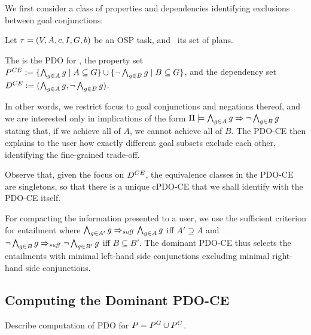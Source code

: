 We first consider a class of properties and dependencies identifying
exclusions between goal conjunctions:

\begin{definition}
Let $\tau =
(V,\allowbreak A,\allowbreak{\ensuremath{c}},\allowbreak I,\allowbreak G,\allowbreak{\ensuremath{b}})$
be an OSP task, and \plans\ its set of plans.  

The  is the PDO for
\plans, the property set $P^{CE} := \{\bigwedge_{g \in A}
g\allowbreak\mid\allowbreak A \subseteq G\} \cup \{\neg \bigwedge_{g
  \in B} g \allowbreak\mid\allowbreak B \subseteq G\}$, and the
dependency set $D^{CE} := (\bigwedge_{g \in A} g,\allowbreak\neg
\bigwedge_{g \in B} g)$.
\end{definition}

In other words, we restrict focus to goal conjunctions and negations
thereof, and we are interested only in implications of the form
$\Pi \models \bigwedge_{g \in A} g \Rightarrow \neg \bigwedge_{g \in B} g$
stating that, if we achieve all of $A$, we cannot achieve all of
$B$. The PDO-CE then explains to the user how exactly different goal
subsets exclude each other, identifying the fine-grained trade-off.

Observe that, given the focus on $D^{CE}$, the equivalence classes
in the PDO-CE are singletons, so that there is a unique cPDO-CE that
we shall identify with the PDO-CE itself.

For compacting the information presented to a user, we use the
sufficient criterion for entailment where $\bigwedge_{g \in A'} g
\Rightarrow_{\mathit{suff}} \bigwedge_{g \in A} g$ iff $A' \supseteq A$ and $\neg
\bigwedge_{g \in B} g \Rightarrow_{\mathit{suff}} \neg \bigwedge_{g \in B'} g$ iff $B
\subseteq B'$. The dominant PDO-CE thus selects the entailments with
minimal left-hand side conjunctions excluding minimal right-hand side
conjunctions.
%





\subsection{Computing the Dominant PDO-CE}
\label{goaldep:computing}

Describe computation of PDO for $P = P^{G} \cup P^{C}$.


